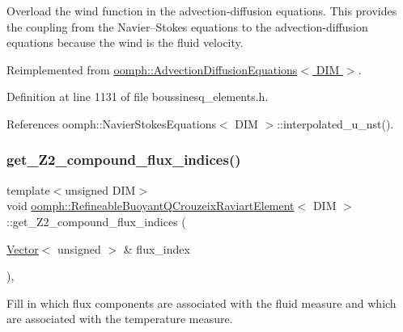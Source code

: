 Overload the wind function in the advection-\/diffusion equations. This provides the coupling from the Navier--Stokes equations to the advection-\/diffusion equations because the wind is the fluid velocity. 



Reimplemented from \hyperlink{classoomph_1_1AdvectionDiffusionEquations_a32cb2f977b32fabfc23d1134749371ed}{oomph\+::\+Advection\+Diffusion\+Equations$<$ D\+I\+M $>$}.



Definition at line 1131 of file boussinesq\+\_\+elements.\+h.



References oomph\+::\+Navier\+Stokes\+Equations$<$ D\+I\+M $>$\+::interpolated\+\_\+u\+\_\+nst().

\mbox{\label{classoomph_1_1RefineableBuoyantQCrouzeixRaviartElement_ac8b5c8d8df0dc6d7af67570c609f591b}} 
\subsubsection{\texorpdfstring{get\+\_\+\+Z2\+\_\+compound\+\_\+flux\+\_\+indices()}{get\_Z2\_compound\_flux\_indices()}}
{\footnotesize\ttfamily template$<$unsigned D\+IM$>$ \\
void \hyperlink{classoomph_1_1RefineableBuoyantQCrouzeixRaviartElement}{oomph\+::\+Refineable\+Buoyant\+Q\+Crouzeix\+Raviart\+Element}$<$ D\+IM $>$\+::get\+\_\+\+Z2\+\_\+compound\+\_\+flux\+\_\+indices (\begin{DoxyParamCaption}\item[{\hyperlink{classoomph_1_1Vector}{Vector}$<$ unsigned $>$ \&}]{flux\+\_\+index }\end{DoxyParamCaption})\hspace{0.3cm}{\ttfamily [inline]}, {\ttfamily [virtual]}}



Fill in which flux components are associated with the fluid measure and which are associated with the temperature measure. 



